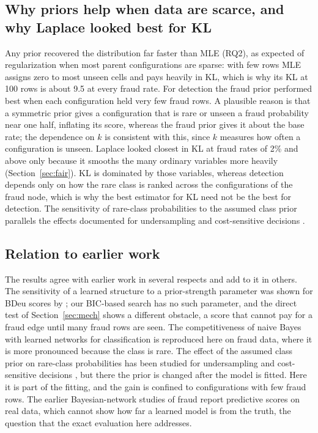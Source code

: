 \documentclass[final,5p,times,authoryear]{elsarticle}
\begin{document}
\subsection{Why priors help when data are scarce, and why Laplace looked best for KL}
Any prior recovered the distribution far faster than MLE (RQ2), as expected of regularization when most parent configurations are sparse: with few rows MLE assigns zero to most unseen cells and pays heavily in KL, which is why its KL at 100 rows is about 9.5 at every fraud rate. For detection the fraud prior performed best when each configuration held very few fraud rows. A plausible reason is that a symmetric prior gives a configuration that is rare or unseen a fraud probability near one half, inflating its score, whereas the fraud prior gives it about the base rate; the dependence on $k$ is consistent with this, since $k$ measures how often a configuration is unseen. Laplace looked closest in KL at fraud rates of 2\% and above only because it smooths the many ordinary variables more heavily (Section~\ref{sec:fair}). KL is dominated by those variables, whereas detection depends only on how the rare class is ranked across the configurations of the fraud node, which is why the best estimator for KL need not be the best for detection. The sensitivity of rare-class probabilities to the assumed class prior parallels the effects documented for undersampling and cost-sensitive decisions \citep{dalpozzolo2015,elkan2001}.

\subsection{Relation to earlier work}
The results agree with earlier work in several respects and add to it in others. The sensitivity of a learned structure to a prior-strength parameter was shown for BDeu scores by \citet{silander2007}; our BIC-based search has no such parameter, and the direct test of Section~\ref{sec:mech} shows a different obstacle, a score that cannot pay for a fraud edge until many fraud rows are seen. The competitiveness of naive Bayes with learned networks for classification \citep{friedman1997} is reproduced here on fraud data, where it is more pronounced because the class is rare. The effect of the assumed class prior on rare-class probabilities has been studied for undersampling \citep{dalpozzolo2015} and cost-sensitive decisions \citep{elkan2001}, but there the prior is changed after the model is fitted. Here it is part of the fitting, and the gain is confined to configurations with few fraud rows. The earlier Bayesian-network studies of fraud \citep{ezawa1995,maes2002,kirkos2007} report predictive scores on real data, which cannot show how far a learned model is from the truth, the question that the exact evaluation here addresses.
\end{document}
